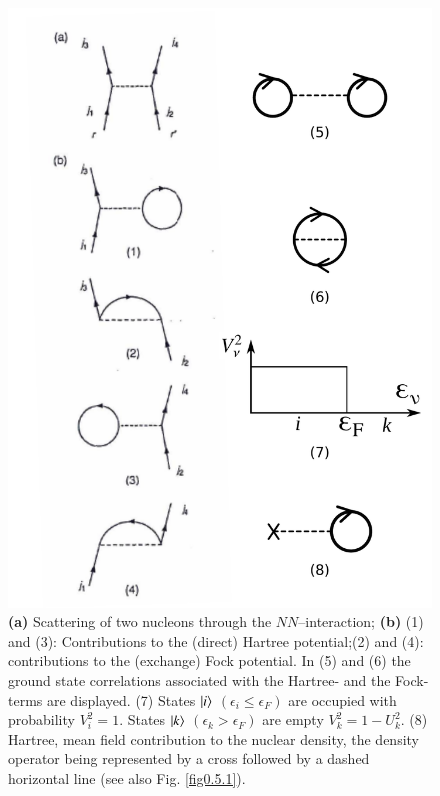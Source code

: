 \begin{figure}
	\centerline {
		\includegraphics*[width=12cm]{introduccion/figs/figpreface6}
	}
	\caption{\textbf{(a)} Scattering of two nucleons through the  $NN$--interaction; \textbf{(b)} (1) and (3): Contributions to the (direct) Hartree potential;(2) and (4): contributions to the (exchange) Fock potential. In (5) and (6) the ground state correlations associated with the Hartree- and the Fock-terms are displayed. (7) States $|{i} \rangle$ $(\epsilon_i\leq\epsilon_F)$ are occupied with probability $V^2_i=1$. States $|{k} \rangle$ $(\epsilon_k>\epsilon_F)$ are empty $V^2_k=1-U^2_k$. (8) Hartree, mean field contribution to the  nuclear density, the density operator being represented by a cross followed by a dashed horizontal line (see also Fig. \ref{fig0.5.1}).}
	\label{fig1.0.6}
\end{figure}
